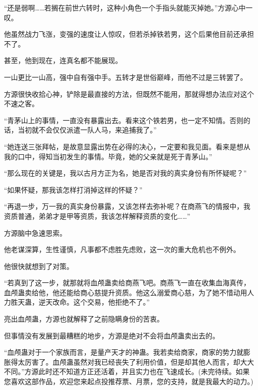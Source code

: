 \begin{this_body}
“还是弱啊……若搁在前世六转时，这种小角色一个手指头就能灭掉她。”方源心中一叹。

他虽然战力飞涨，变强的速度让人惊叹，但若杀掉铁若男，这个后果他目前还承担不了。

甚至，他到现在，连真名都不能展现。

一山更比一山高，强中自有强中手。五转才是世俗巅峰，而他不过是三转罢了。

方源很快收拾心神，铲除是最直接的方法，但既然不能用，那就得想办法应对这个不速之客。

“青茅山上的事情，一直没有暴露出去。看来这个铁若男，也一定不知情。否则的话，当初就不会仅仅派遣一队人马，来追捕我了。”

“她连送三张拜帖，是故意显露出势在必得的决心，一定要和我见面。看来是想从我的口中，得知当初发生的事情。毕竟，她的父亲就是死于青茅山。”

“那么现在的关键是，我以古月方正为名，她是否对我的真实身份有所怀疑呢？”

“如果怀疑，那我该怎样打消掉这样的怀疑？”

“再退一步，万一我的真实身份暴露，又该怎样去弥补呢？在商燕飞的情报中，我资质普通，弟弟才是甲等资质，我该怎样解释资质的变化……”

方源脑中急速思索。

他老谋深算，生性谨慎，凡事都不虑胜先虑败，这一次的重大危机也不例外。

他很快就想到了对策。

“若真到了这一步，就那就将血颅蛊卖给商燕飞吧。商燕飞一直在收集血海真传，血颅蛊卖给他，他还能给商心慈提升资质。他这么溺爱商心慈，为了她不惜动用人力胜天蛊，逆天改命。这个交易，他拒绝不了。”

亮出血颅蛊，方源也就解释了之前隐瞒身份的苦衷。

但事情没有发展到最糟糕的地步，方源是绝对不会将血颅蛊卖出去的。

“血颅蛊对于一个家族而言，是量产天才的神蛊。我若卖给商家，商家的势力就膨胀得太厉害了。血颅蛊虽然对我已经丧失了利用价值，但是却其他人而言，却大大不同。”方源此时还不知道方正还活着，并且实力也在飞速成长。(未完待续。如果您喜欢这部作品，欢迎您来起点投推荐票、月票，您的支持，就是我最大的动力。)

\end{this_body}

